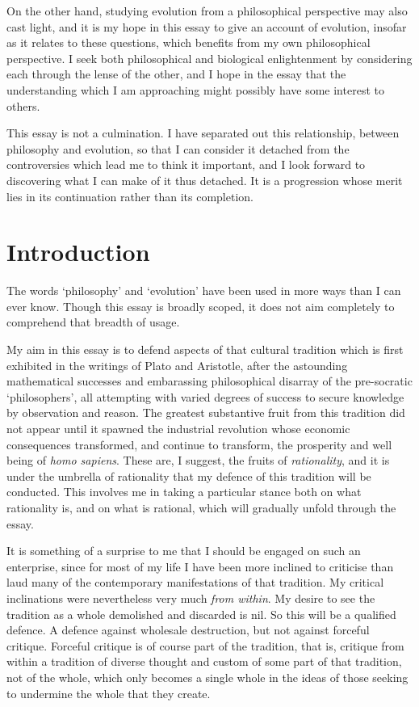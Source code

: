 \documentclass[10pt,titlepage]{article}
\begin{document}
On the other hand, studying evolution from a philosophical perspective may also cast light, and it is my hope in this essay to give an account of evolution, insofar as it relates to these questions, which benefits from my own philosophical perspective.
I seek both philosophical and biological enlightenment by considering each through the lense of the other, and I hope in the essay that the understanding which I am approaching might possibly have some interest to others.

This essay is not a culmination.
I have separated out this relationship, between philosophy and evolution, so that I can consider it detached from the controversies which lead me to think it important, and I look forward to discovering what I can make of it thus detached.
It is a progression whose merit lies in its continuation rather than its completion.

\section{Introduction}

The words `philosophy' and `evolution' have been used in more ways than I can ever know.
Though this essay is broadly scoped, it does not aim completely to comprehend that breadth of usage.

My aim in this essay is to defend aspects of that cultural tradition which is first exhibited in the writings of Plato and Aristotle, after the astounding mathematical successes and embarassing philosophical disarray of the pre-socratic `philosophers', all attempting with varied degrees of success to secure knowledge by observation and reason.
The greatest substantive fruit from this tradition did not appear until it spawned the industrial revolution whose economic consequences transformed, and continue to transform, the prosperity and well being of \emph{homo sapiens}.
These are, I suggest, the fruits of \emph{rationality}, and it is under the umbrella of rationality that my defence of this tradition will be conducted.
This involves me in taking a particular stance both on what rationality is, and on what is rational, which will gradually unfold through the essay.

It is something of a surprise to me that I should be engaged on such an enterprise, since for most of my life I have been more inclined to criticise than laud many of the contemporary manifestations of that tradition.
My critical inclinations were nevertheless very much \emph{from within}.
My desire to see the tradition as a whole demolished and discarded is nil.
So this will be a qualified defence.
A defence against wholesale destruction, but not against forceful critique.
Forceful critique is of course part of the tradition, that is, critique from within a tradition of diverse thought and custom of some part of that tradition, not of the whole, which only becomes a single whole in the ideas of those seeking to undermine the whole that they create.
\end{document}
